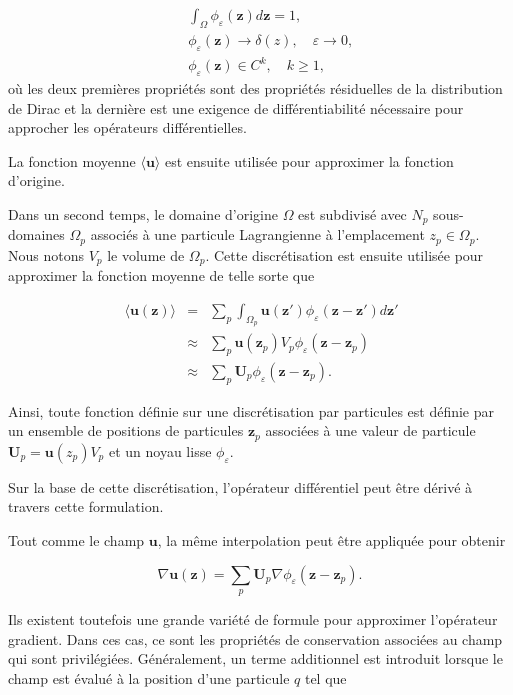 \begin{eqnarray*}
    && \int_{\Omega} \phi_\varepsilon(\bm{z}) d\bm{z} = 1,      \\
    && \phi_\varepsilon(\bm{z}) \to \delta(z), \quad \varepsilon \to 0, \\
    && \phi_\varepsilon(\bm{z}) \in C^k,  \quad k \geq 1,
\end{eqnarray*} où les deux premières propriétés sont des propriétés résiduelles de la distribution de Dirac et la dernière est une exigence de différentiabilité nécessaire pour approcher les opérateurs différentielles.

La fonction moyenne $\langle \bm{u} \rangle$ est ensuite utilisée pour approximer la fonction d'origine.

Dans un second temps, le domaine d'origine $\Omega$ est subdivisé avec $N_p$ sous-domaines $\Omega_p$ associés à une particule Lagrangienne à l'emplacement $z_p \in \Omega_p$. Nous notons $V_p$ le volume de $\Omega_p$. Cette discrétisation est ensuite utilisée pour approximer la fonction moyenne de telle sorte que

\begin{eqnarray*}~\label{part_approx}
    \langle \bm{u}(\bm{z}) \rangle &=& \sum_p \int_{\Omega_p} \bm{u}(\bm{z'}) \phi_\varepsilon(\bm{z}-\bm{z'}) d\bm{z'} \\
    &\approx& \sum_p \bm{u}(\bm{z}_p) V_p \phi_\varepsilon (\bm{z}-\bm{z}_p) \\
    &\approx& \sum_p \bm{U}_p \phi_\varepsilon (\bm{z}-\bm{z}_p).
\end{eqnarray*}

Ainsi, toute fonction définie sur une discrétisation par particules est définie par un ensemble de positions de particules $\bm{z}_p$ associées à une valeur de particule $\bm{U}_p = \bm{u}(z_p) V_p$ et un noyau lisse $\phi_\varepsilon$.

Sur la base de cette discrétisation, l'opérateur différentiel peut être dérivé à travers cette formulation.

Tout comme le champ $\bm u$, la même interpolation peut être appliquée pour obtenir

\begin{equation*}
    \nabla \bm{u}(\bm{z}) = \sum_p \bm{U}_p \nabla \phi_\varepsilon (\bm{z}-\bm{z}_p).
\end{equation*}

Ils existent toutefois une grande variété de formule pour approximer l'opérateur gradient. Dans ces cas, ce sont les propriétés de conservation associées au champ qui sont privilégiées.
Généralement, un terme additionnel est introduit lorsque le champ est évalué à la position d'une particule $q$ tel que

